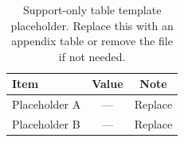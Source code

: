\begin{table}[t]
\caption{Support-only table template placeholder. Replace this with an appendix
table or remove the file if not needed.}
\label{tbl:table-template-appendix}
\centering
\small
\begin{tabular}{@{}l c c@{}}
\toprule
Item & Value & Note \\
\midrule
Placeholder A & --- & Replace \\
Placeholder B & --- & Replace \\
\bottomrule
\end{tabular}
\end{table}
